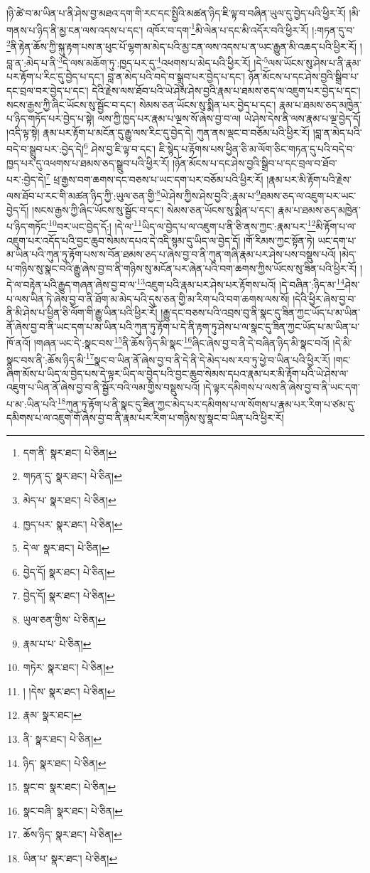 །ཉི་ཚེ་བ་མ་ཡིན་པ་ནི་ཤེས་བྱ་མཐའ་དག་གི་རང་དང་སྤྱིའི་མཚན་ཉིད་ཇི་ལྟ་བ་བཞིན་ཡུལ་དུ་བྱེད་པའི་ཕྱིར་རོ། །མི་གནས་པ་ཉིད་ནི་མྱ་ངན་ལས་འདས་པ་དང་། འཁོར་བ་དག་\footnote{དག་ནི་  སྣར་ཐང་།  པེ་ཅིན། }མི་ལེན་པ་དང་མི་འདོར་བའི་ཕྱིར་རོ། །:གཏན་དུ་བ་\footnote{གཏན་དུ་  སྣར་ཐང་།  པེ་ཅིན། }ནི་རྟེན་ཆོས་ཀྱི་སྐུ་རྟག་པས་ན་ཕུང་པོ་ལྷག་མ་མེད་པའི་མྱ་ངན་ལས་འདས་པ་ན་ཡང་རྒྱུན་མི་འཆད་པའི་ཕྱིར་རོ། །བླ་ན་:མེད་པ་ནི་\footnote{མེད་པ་  སྣར་ཐང་།  པེ་ཅིན། }དེ་ལས་མཆོག་ཏུ་:ཁྱད་པར་དུ་\footnote{ཁྱད་པར་  སྣར་ཐང་།  པེ་ཅིན། }འཕགས་པ་མེད་པའི་ཕྱིར་རོ། །དེ་\footnote{དེ་ལ་  སྣར་ཐང་།  པེ་ཅིན། }ལས་ཡོངས་སུ་ཤེས་པ་ནི་རྣམ་པར་རྟོག་པ་རིང་དུ་བྱེད་པ་དང་། བླ་ན་མེད་པའི་བདེ་བ་སྒྲུབ་པར་བྱེད་པ་དང་། ཉོན་མོངས་པ་དང་ཤེས་བྱའི་སྒྲིབ་པ་དང་བྲལ་བར་བྱེད་པ་དང་། དེའི་རྗེས་ལས་ཐོབ་པའི་ཡེ་ཤེས་ཤེས་བྱའི་རྣམ་པ་ཐམས་ཅད་ལ་འཇུག་པར་བྱེད་པ་དང་། སངས་རྒྱས་ཀྱི་ཞིང་ཡོངས་སུ་སྦྱོང་བ་དང་། སེམས་ཅན་ཡོངས་སུ་སྨིན་པར་བྱེད་པ་དང་། རྣམ་པ་ཐམས་ཅད་མཁྱེན་པ་ཉིད་གཏོད་པར་བྱེད་པ་སྟེ། ལས་ཀྱི་ཁྱད་པར་རྣམ་པ་ལྔས་སོ་ཞེས་བྱ་བ་ལ། ཡེ་ཤེས་དེས་ནི་ལས་རྣམ་པ་ལྔ་བྱེད་དོ། །འདི་ལྟ་སྟེ། རྣམ་པར་རྟོག་པ་མངོན་དུ་རྒྱུ་ལས་རིང་དུ་བྱེད་དེ། ཀུན་ནས་ལྡང་བ་བཅོམ་པའི་ཕྱིར་རོ། །བླ་ན་མེད་པའི་བདེ་བ་སྒྲུབ་པར་:བྱེད་དེ།\footnote{བྱེད་དོ།  སྣར་ཐང་།  པེ་ཅིན། } ཤེས་བྱ་ཇི་ལྟ་བ་དང་། ཇི་སྙེད་པ་རྟོགས་པས་ཕྱིན་ཅི་མ་ལོག་ཅིང་གཏན་དུ་པའི་བདེ་བ་ཁྱད་པར་དུ་འཕགས་པ་ཐམས་ཅད་སྒྲུབ་པའི་ཕྱིར་རོ། །ཉོན་མོངས་པ་དང་ཤེས་བྱའི་སྒྲིབ་པ་དང་བྲལ་བ་ཐོབ་པར་:བྱེད་དེ།\footnote{བྱེད་དོ།  སྣར་ཐང་།  པེ་ཅིན། } ཕྲ་རྒྱས་བག་ཆགས་དང་བཅས་པ་ཡང་དག་པར་བཅོམ་པའི་ཕྱིར་རོ། །རྣམ་པར་མི་རྟོག་པའི་རྗེས་ལས་ཐོབ་པ་རང་གི་མཚན་ཉིད་ཀྱི་:ཡུལ་ཅན་གྱི་\footnote{ཡུལ་ཅན་གྱིས་  པེ་ཅིན། }ཡེ་ཤེས་ཀྱིས་ཤེས་བྱའི་:རྣམ་པ་\footnote{རྣམ་པ་པ་  པེ་ཅིན། }ཐམས་ཅད་ལ་འཇུག་པར་ཡང་བྱེད་དོ། །སངས་རྒྱས་ཀྱི་ཞིང་ཡོངས་སུ་སྦྱོང་བ་དང་། སེམས་ཅན་ཡོངས་སུ་སྨིན་པ་དང་། རྣམ་པ་ཐམས་ཅད་མཁྱེན་པ་ཉིད་གཏོང་\footnote{གཏེར་  སྣར་ཐང་།  པེ་ཅིན། }བར་ཡང་བྱེད་དོ:། །དེ་ལ་\footnote{། །དེས་  སྣར་ཐང་།  པེ་ཅིན། }ཡིད་ལ་བྱེད་པ་ལ་འཇུག་པ་ནི་ཅི་ནས་ཀྱང་:རྣམ་པར་\footnote{རྣམ་  སྣར་ཐང་། }མི་རྟོག་པ་ལ་འཇུག་པར་འདོད་པའི་བྱང་ཆུབ་སེམས་དཔའ་དེ་འདི་སྙམ་དུ་ཡིད་ལ་བྱེད་དོ། །གོ་རིམས་ཀྱང་སྟོན་ཏེ། ཡང་དག་པ་མ་ཡིན་པའི་ཀུན་ཏུ་རྟོག་པས་ས་བོན་ཐམས་ཅད་པ་ཞེས་བྱ་བ་ནི་ཀུན་གཞི་རྣམ་པར་ཤེས་པས་བསྡུས་པའོ། །མེད་པ་གཉིས་སུ་སྣང་བའི་རྒྱུ་ཞེས་བྱ་བ་ནི་གཉིས་སུ་མངོན་པར་ཞེན་པའི་བག་ཆགས་ཀྱིས་ཡོངས་སུ་ཟིན་པའི་ཕྱིར་རོ། །དེ་ལ་བརྟེན་པའི་རྒྱུད་གཞན་ཞེས་བྱ་བ་ལ་\footnote{ནི་  སྣར་ཐང་།  པེ་ཅིན། }འཇུག་པའི་རྣམ་པར་ཤེས་པར་རྟོགས་པའོ། །དེ་བཞིན་:ཉིད་མ་\footnote{ཉིད་  སྣར་ཐང་།  པེ་ཅིན། }ཤེས་པ་ལས་ཡིན་ཏེ་ཞེས་བྱ་བ་ནི་ཐོག་མ་མེད་པའི་དུས་ཅན་གྱི་མ་རིག་པའི་བག་ཆགས་ལས་སོ། །དེའི་ཕྱིར་ཞེས་བྱ་བ་ནི་མི་ཤེས་པ་ཕྱིན་ཅི་ལོག་གི་རྒྱུ་ཡིན་པའི་ཕྱིར་རོ། །རྒྱུ་དང་བཅས་པའི་འབྲས་བུ་ནི་སྣང་དུ་ཟིན་ཀྱང་ཡོད་པ་མ་ཡིན་ནོ་ཞེས་བྱ་བ་ནི་ཡང་དག་པ་མ་ཡིན་པའི་ཀུན་ཏུ་རྟོག་པ་དེ་ནི་རྟག་ཏུ་ཤེས་པ་ལ་སྣང་དུ་ཟིན་ཀྱང་ཡོད་པ་མ་ཡིན་པ་ཁོ་ནའོ། །གཞན་ཡང་དེ་:སྣང་བས་\footnote{སྣང་བ་  སྣར་ཐང་།  པེ་ཅིན། }ནི་ཆོས་ཉིད་མི་སྣང་\footnote{སྣང་བཞི་  སྣར་ཐང་།  པེ་ཅིན། }ཞིང་ཞེས་བྱ་བ་ནི་དེ་བཞིན་ཉིད་མི་སྣང་བའོ། །དེ་མི་སྣང་བས་ནི་:ཆོས་ཉིད་མི་\footnote{ཆོས་ཉིད་  སྣར་ཐང་།  པེ་ཅིན། }སྣང་བ་ཡིན་ནོ་ཞེས་བྱ་བ་ནི་དེ་ནི་དེ་མེད་པས་རབ་ཏུ་ཕྱེ་བ་ཡིན་པའི་ཕྱིར་རོ། །གང་ཞིག་མོས་པ་ཡིད་ལ་བྱེད་པས་དེ་ལྟར་ཡིད་ལ་བྱེད་པའི་བྱང་ཆུབ་སེམས་དཔའ་རྣམ་པར་མི་རྟོག་པའི་ཡེ་ཤེས་ལ་འཇུག་པ་ཡིན་ནོ་ཞེས་བྱ་བ་ནི་སྦྱོར་བའི་ལམ་གྱིས་བསྡུས་པའོ། །དེ་ལྟར་དམིགས་པ་ལས་ནི་ཞེས་བྱ་བ་ནི་ཡང་དག་པ་མ་:ཡིན་པའི་\footnote{ཡིན་པ་  སྣར་ཐང་།  པེ་ཅིན། }ཀུན་ཏུ་རྟོག་པ་ནི་སྣང་དུ་ཟིན་ཀྱང་མེད་པར་དམིགས་པ་ལ་སོགས་པ་རྣམ་པར་རིག་པ་ཙམ་དུ་དམིགས་པ་ལ་འཇུག་གོ་ཞེས་བྱ་བ་ནི་རྣམ་པར་རིག་པ་གཉིས་སུ་སྣང་བ་ཡིན་པའི་ཕྱིར་རོ། 